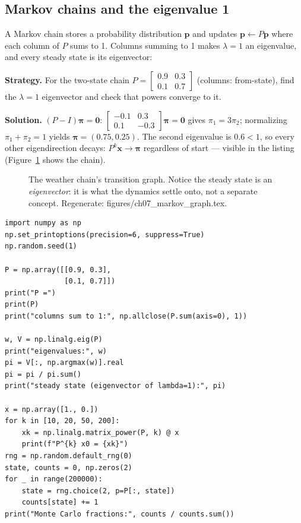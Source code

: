 \subsection*{Markov chains and the eigenvalue 1}

A Markov chain stores a probability distribution $\mathbf p$ and updates
$\mathbf p\leftarrow P\mathbf p$ where each column of $P$ sums to 1.
Columns summing to 1 makes $\lambda=1$ an eigenvalue, and every steady
state is its eigenvector:

\begin{example}\label{ex:markov}
\textbf{Strategy.} For the two-state chain
$P=\begin{bmatrix}0.9&0.3\\0.1&0.7\end{bmatrix}$ (columns: from-state),
find the $\lambda=1$ eigenvector and check that powers converge to it.

\textbf{Solution.} $(P-I)\boldsymbol\pi=\mathbf0$:
$\begin{bmatrix}-0.1&0.3\\0.1&-0.3\end{bmatrix}\boldsymbol\pi=\mathbf0$
gives $\pi_1=3\pi_2$; normalizing $\pi_1+\pi_2=1$ yields
$\boldsymbol\pi=(0.75,0.25)$. The second eigenvalue is $0.6<1$, so every
other eigendirection decays: $P^{k}\mathbf x\to\boldsymbol\pi$ regardless
of start --- visible in the listing (Figure~\ref{fig:markov-graph} shows
the chain).
\end{example}

\begin{figure}[htbp]
\centering

\caption{The weather chain's transition graph. Notice the steady state is
an \emph{eigenvector}: it is what the dynamics settle onto, not a separate
concept. Regenerate: \ttfamily figures/ch07\_markov\_graph.tex.}
\label{fig:markov-graph}
\end{figure}

\begin{lstlisting}[caption={\ttfamily code/ch07\_markov\_steady.py ---
steady state from \ttfamily np.linalg.eig, from matrix powers, and from a
Monte-Carlo run of 200{,}000 steps.}]
import numpy as np
np.set_printoptions(precision=6, suppress=True)
np.random.seed(1)

P = np.array([[0.9, 0.3],
              [0.1, 0.7]])
print("P =")
print(P)
print("columns sum to 1:", np.allclose(P.sum(axis=0), 1))

w, V = np.linalg.eig(P)
print("eigenvalues:", w)
pi = V[:, np.argmax(w)].real
pi = pi / pi.sum()
print("steady state (eigenvector of lambda=1):", pi)

x = np.array([1., 0.])
for k in [10, 20, 50, 200]:
    xk = np.linalg.matrix_power(P, k) @ x
    print(f"P^{k} x0 = {xk}")
rng = np.random.default_rng(0)
state, counts = 0, np.zeros(2)
for _ in range(200000):
    state = rng.choice(2, p=P[:, state])
    counts[state] += 1
print("Monte Carlo fractions:", counts / counts.sum())
\end{lstlisting}

